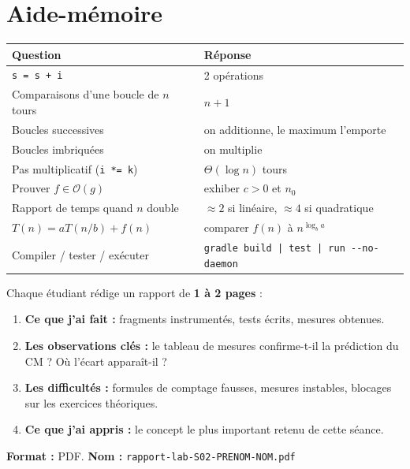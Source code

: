 \documentclass[11pt,a4paper]{article}
\newcommand{\bigO}{\mathcal{O}}
\newcommand{\bigTheta}{\Theta}
\begin{document}
\section*{Aide-mémoire}

\begin{center}
\begin{tabular}{ll}
\toprule
\textbf{Question} & \textbf{Réponse} \\
\midrule
\texttt{s = s + i} & 2 opérations \\
Comparaisons d'une boucle de $n$ tours & $n + 1$ \\
Boucles successives & on additionne, le maximum l'emporte \\
Boucles imbriquées & on multiplie \\
Pas multiplicatif (\texttt{i *= k}) & $\bigTheta(\log n)$ tours \\
Prouver $f \in \bigO(g)$ & exhiber $c > 0$ et $n_0$ \\
Rapport de temps quand $n$ double & $\approx 2$ si linéaire, $\approx 4$ si quadratique \\
$T(n) = aT(n/b) + f(n)$ & comparer $f(n)$ à $n^{\log_b a}$ \\
\midrule
Compiler / tester / exécuter & \texttt{gradle build | test | run -\/-no-daemon} \\
\bottomrule
\end{tabular}
\end{center}

\begin{attentionbox}
Chaque étudiant rédige un rapport de \textbf{1 à 2 pages} :
\begin{enumerate}[nosep]
    \item \textbf{Ce que j'ai fait :} fragments instrumentés, tests écrits,
          mesures obtenues.
    \item \textbf{Les observations clés :} le tableau de mesures
          confirme-t-il la prédiction du CM ? Où l'écart apparaît-il ?
    \item \textbf{Les difficultés :} formules de comptage fausses, mesures
          instables, blocages sur les exercices théoriques.
    \item \textbf{Ce que j'ai appris :} le concept le plus important retenu
          de cette séance.
\end{enumerate}
\textbf{Format :} PDF. \textbf{Nom :} \texttt{rapport-lab-S02-PRENOM-NOM.pdf}
\end{attentionbox}
\end{document}
